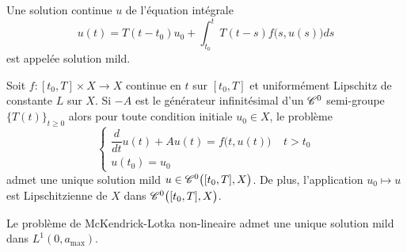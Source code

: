 \begin{frame}
    \begin{definition}
        Une solution continue $u$ de l'équation intégrale
        \begin{equation*}
            u(t) = T(t-t_0)u_0 + \int_{t_0}^t T(t-s)f\big(s,u(s)\big)d s
        \end{equation*}
        est appelée \textcolor{astral}{solution mild}.
    \end{definition}
    \pause
    \begin{theorem}
        Soit $f:[t_0,T] \times X \rightarrow X$ continue en $t$ sur $[t_0,T]$ et uniformément Lipschitz de constante $L$ sur $X$. Si $-A$ est le générateur infinitésimal d'un $\mathscr{C}^0$ semi-groupe $\big\{T(t)\big\}_{t \geq 0}$ alors pour toute condition initiale $u_0 \in X$, le problème
        \begin{equation*}
            \left\{\begin{array}{l}
                \dfrac{d}{d t}u(t) +Au(t)=f\big(t,u(t)\big) \ \ \ \ \ t >t_0 \\
                u(t_0) = u_0
            \end{array}\right.
        \end{equation*}
        admet une unique solution mild $u \in \mathscr{C}^0\big([t_0,T],X\big)$. De plus, l'application $u_0 \mapsto u$ est Lipschitzienne de $X$ dans $\mathscr{C}^0\big([t_0,T],X\big)$.
    \end{theorem}
    \pause
    \begin{theorem}
        Le problème de McKendrick-Lotka non-lineaire admet une unique solution mild dans $L^1(0,a_{\max})$.
    \end{theorem}
\end{frame}

